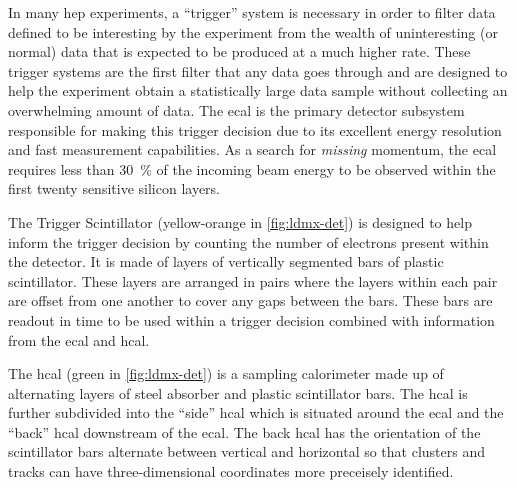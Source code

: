In many \ac{hep} experiments, a ``trigger'' system is necessary in order to filter data defined to
be interesting by the experiment from the wealth of uninteresting (or normal) data that is expected
to be produced at a much higher rate. These trigger systems are the first filter that any data
goes through and are designed to help the experiment obtain a statistically large data sample
without collecting an overwhelming amount of data. The \ac{ecal} is the primary detector subsystem
responsible for making this trigger decision due to its excellent energy resolution and fast
measurement capabilities. As a search for \emph{missing} momentum, the \ac{ecal} requires less than
\qty{30}{\percent} of the incoming beam energy to be observed within the first twenty sensitive
silicon layers.

The Trigger Scintillator (yellow-orange in \cref{fig:ldmx-det}) is designed to help inform the
trigger decision by counting the number of electrons present within the detector. It is made of
layers of vertically segmented bars of plastic scintillator. These layers are arranged in pairs
where the layers within each pair are offset from one another to cover any gaps between the bars.
These bars are readout in time to be used within a trigger decision combined with information from
the \ac{ecal} and \ac{hcal}.

The \ac{hcal} (green in \cref{fig:ldmx-det}) is a sampling calorimeter made up of alternating
layers of steel absorber and plastic scintillator bars. The \ac{hcal} is further subdivided into
the ``side'' \ac{hcal} which is situated around the \ac{ecal} and the ``back'' \ac{hcal} downstream
of the \ac{ecal}. The back \ac{hcal} has the orientation of the scintillator bars alternate between
vertical and horizontal so that clusters and tracks can have three-dimensional coordinates more
preceisely identified.

